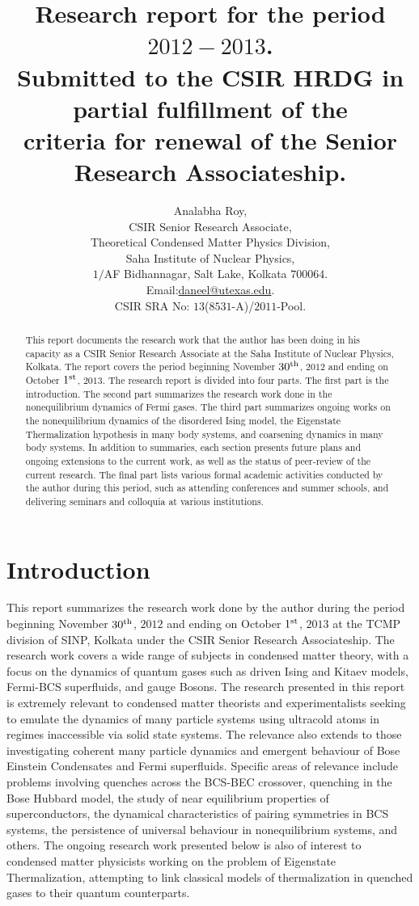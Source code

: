 \documentclass[a4paper,10pt]{report}
\title{Research report for the period $2012-2013$.\\
Submitted to the CSIR HRDG in partial fulfillment of the\\ 
criteria for renewal of the Senior Research Associateship.
}
\author{Analabha Roy,\\
CSIR Senior Research Associate,\\
Theoretical Condensed Matter Physics Division,\\
Saha Institute of Nuclear Physics,\\
$1/$AF Bidhannagar, Salt Lake, Kolkata $700064$.\\
Email:\url{daneel@utexas.edu}.\\
CSIR SRA No: $13$($8531$-A)/$2011$-Pool.
}
\begin{document}
\maketitle

\begin{abstract}
This report documents the research work that the author has been doing in his capacity as a CSIR Senior Research Associate at the Saha Institute of Nuclear Physics, Kolkata. The report covers the period beginning November $30^{\rm th}$, $2012$ and ending on October $1^{\rm st}$, $2013$. The research report is divided into four parts. 
The first part is the introduction. The second part summarizes the research work done in the nonequilibrium dynamics of Fermi gases. The third part summarizes ongoing works on the nonequilibrium dynamics of the disordered Ising model, the Eigenstate Thermalization hypothesis in many body systems, and coarsening dynamics in many body systems.
In addition to summaries, each section presents future plans and ongoing extensions to the current work, as well as the status of peer-review of the current research. The final part lists various formal academic activities conducted by the author during this period, such as attending conferences and summer schools, and delivering seminars and colloquia at various institutions.
\end{abstract}
\section{\sc Introduction}
\label{sec:intro}
This report summarizes the research work done by the author during the period beginning November $30^{\rm th}$, $2012$ and ending on October $1^{\rm st}$, $2013$ at the TCMP division of SINP, Kolkata under the CSIR Senior Research Associateship. The research work covers a wide range of subjects in condensed matter theory, with a focus on the dynamics of quantum gases such as driven Ising and Kitaev models, Fermi-BCS superfluids, and gauge Bosons. The research presented in this report is extremely relevant to condensed matter theorists and experimentalists seeking to emulate the dynamics of many particle systems using ultracold atoms in regimes inaccessible via solid state systems. The relevance also extends to those investigating coherent many particle dynamics and emergent behaviour of Bose Einstein Condensates and Fermi superfluids. Specific areas of relevance include problems involving quenches across the BCS-BEC crossover, quenching in the Bose Hubbard model, the study of near equilibrium properties of superconductors, the dynamical characteristics of pairing symmetries in BCS systems, the persistence of universal behaviour in nonequilibrium systems, and others. The ongoing research work presented below is also of interest to condensed matter physicists working on the problem of Eigenstate Thermalization, attempting to link classical models of thermalization in quenched gases to their quantum counterparts.
\end{document}
